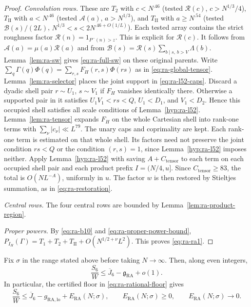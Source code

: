 \begin{proof}
\emph{Convolution rows.} These are \(T_2\) with \(c<N^{.46}\) (tested
\(\mathcal R(c)\), \(c>N^{1/3}/4\)), \(T_{\mathrm{II}}\) with
\(a<N^{.46}\) (tested \(\mathcal A(a)\), \(a>N^{1/3}\)), and
\(T_{\mathrm{II}}\) with \(a\ge N^{.54}\) (tested \(\mathcal B(s)/(2L)\),
\(N^{1/3}<s<2N^{.46+O(1/L)}\)). Each tested array contains the
strict roughness factor \(\mathcal R(n)=1_{P^-(n)>z}\).
This is explicit
for \(\mathcal R(c)\).
It follows from
\(\mathcal A(a)=\mu(a)\mathcal R(a)\) and from
\(\mathcal B(s)=\mathcal R(s)\sum_{b\mid s,\ b>V}\Lambda(b)\).
Lemma~\ref{lem:ra-sw} gives \eqref{eq:ra-full-sw} on these original
parents. Write
\(\sum_q\Gamma(q)\Phi(q)=\sum_{r,s}F_H(r,s)\Phi(rs)\) as in
\eqref{eq:ra-global-tensor}. Lemma~\ref{lem:ra-selector} places the
joint support in \eqref{eq:ra-l52-caps}. Discard a dyadic shell pair
\(r\sim U_1\), \(s\sim V_1\) if \(F_H\) vanishes identically there.
Otherwise a supported pair in it satisfies
\(U_1V_1<rs<Q\), \(U_1<D_1\), and \(V_1<D_2\).
Hence this occupied
shell satisfies all scale conditions of Lemma~\ref{hyp:ra-l52}.
Lemma~\ref{lem:ra-tensor} expands \(F_H\) on the whole Cartesian shell
into rank-one terms with \(\sum_\nu|c_\nu|\ll L^{79}\).
The unary caps and coprimality are kept. Each rank-one term is estimated on that
whole shell. Its factors need not preserve the joint condition
\(rs<Q\) or the condition \((r,s)=1\), since
Lemma~\ref{hyp:ra-l52} imposes neither. Apply Lemma~\ref{hyp:ra-l52} with saving \(A+C_{\mathrm{tensor}}\) to each
term on each occupied shell pair and each product prefix
\(I=(N/4,u]\). Since
\(C_{\mathrm{tensor}}\ge83\), the total is \(O(NL^{-A})\), uniformly in \(u\). The factor
\(w\) is then restored by Stieltjes summation, as in
\eqref{eq:ra-restoration}.

\emph{Central rows.} The four central rows are bounded by
Lemma~\ref{lem:ra-product-region}.

\emph{Proper powers.} By \eqref{eq:ra-b10} and
\eqref{eq:ra-proper-power-bound},
\(P_{I_H}(\Gamma)=T_1+T_2+T_{\mathrm{II}}+O(N^{1/2+\nu}L^2)\). This
proves \eqref{eq:ra-ra1}.
\end{proof}

\begin{proposition}\label{prop:ra-b11}
Fix \(\sigma\) in the range stated above before taking \(N\to\infty\).
Then, along even integers,
\begin{equation}\label{eq:ra-b11}
 \frac{S_6}{W}\le\overline J_6-\mathfrak g_{\mathrm{RA}}+o(1).
\end{equation}
In particular, the certified floor in \eqref{eq:ra-rational-floor} gives
\begin{equation}\label{eq:ra-b11-floor}
 \frac{S_6}{W}\le\overline J_6-g_{\mathrm{RA,lo}}
                         +E_{\mathrm{RA}}(N;\sigma),
 \qquad E_{\mathrm{RA}}(N;\sigma)\ge0,\qquad
 E_{\mathrm{RA}}(N;\sigma)\longrightarrow0.
\end{equation}
\end{proposition}

